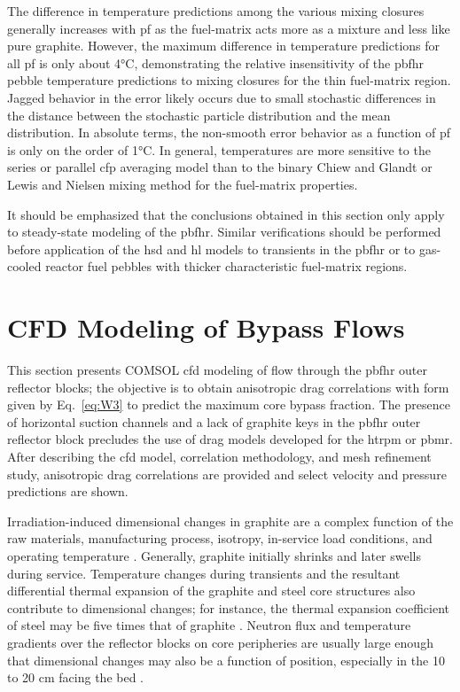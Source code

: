 The difference in temperature predictions among the various mixing closures generally increases with \gls{pf} as the fuel-matrix acts more as a mixture and less like pure graphite. However, the maximum difference in temperature predictions for all \gls{pf} is only about 4\si{\celsius}, demonstrating the relative insensitivity of the \gls{pbfhr} pebble temperature predictions to mixing closures for the thin fuel-matrix region. Jagged behavior in the error likely occurs due to small stochastic differences in the distance between the stochastic particle distribution and the mean distribution. In absolute terms, the non-smooth error behavior as a function of \gls{pf} is only on the order of 1\si{\celsius}. In general, temperatures are more sensitive to the series or parallel \gls{cfp} averaging model than to the binary Chiew and Glandt or Lewis and Nielsen mixing method for the fuel-matrix properties. 

It should be emphasized that the conclusions obtained in this section only apply to steady-state modeling of the \gls{pbfhr}. Similar verifications should be performed before application of the \gls{hsd} and \gls{hl} models to transients in the \gls{pbfhr} or to gas-cooled reactor fuel pebbles with thicker characteristic fuel-matrix regions.

\section[Computational Fluid Dynamics Modeling of Bypass Flows]{CFD Modeling of Bypass Flows}
\label{sec:bypass}

This section presents COMSOL \gls{cfd} modeling of flow through the \gls{pbfhr} outer reflector blocks; the objective is to obtain anisotropic drag correlations with form given by Eq.\ \eqref{eq:W3} to predict the maximum core bypass fraction. The presence of horizontal suction channels and a lack of graphite keys in the \gls{pbfhr} outer reflector block precludes the use of drag models developed for the \gls{htrpm} or \gls{pbmr}. After describing the \gls{cfd} model, correlation methodology, and mesh refinement study, anisotropic drag correlations are provided and select velocity and pressure predictions are shown.

Irradiation-induced dimensional changes in graphite are a complex function of the raw materials, manufacturing process, isotropy, in-service load conditions, and operating temperature \cite{marsden}. Generally, graphite initially shrinks and later swells during service. Temperature changes during transients and the resultant differential thermal expansion of the graphite and steel core structures also contribute to dimensional changes; for instance, the thermal expansion coefficient of steel may be five times that of graphite \cite{marsden}. Neutron flux and temperature gradients over the reflector blocks on core peripheries are usually large enough that dimensional changes may also be a function of position, especially in the 10 to 20 \si{\centi\meter} facing the bed \cite{oehme}.

